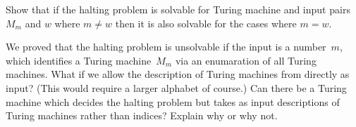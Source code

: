 \documentclass[../../../include/open-logic-section]{subfiles}
\begin{document}
\begin{prob}
Show that if the halting problem is solvable for Turing machine and
input pairs $M_m$ and $w$ where $m\neq w$ then it is also solvable
for the cases where $m = w$.
\end{prob}

\begin{prob}
We proved that the halting problem is unsolvable if the input is a
number~$m$, which identifies a Turing machine~$M_m$ via an enumaration
of all Turing machines.  What if we allow the description of Turing
machines from  directly as input? (This
would require a larger alphabet of course.)  Can there be a Turing
machine which decides the halting problem but takes as input
descriptions of Turing machines rather than indices?  Explain why or
why not.
\end{prob}
\end{document}
